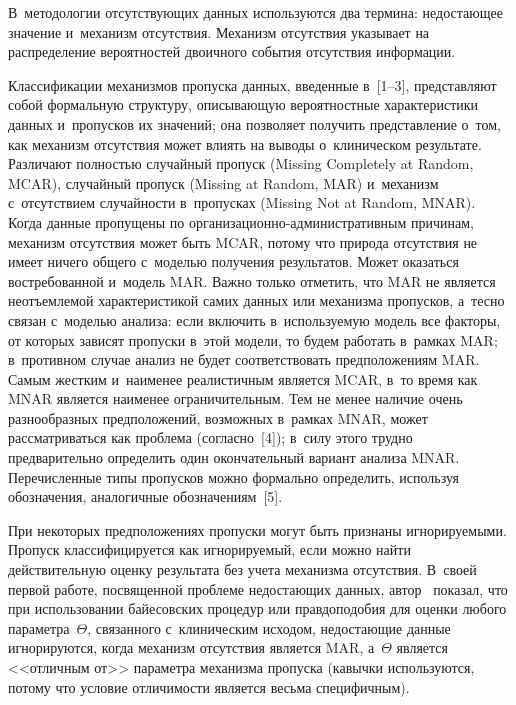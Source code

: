 \begin{multicols}{2}
     В~методологии отсутствующих данных используются два термина: 
недостающее значение и~механизм отсутствия. Механизм отсутствия указывает 
на распределение вероятностей двоичного события отсутствия информации. 
     
     Классификации механизмов пропуска данных, введенные в~[1--3], 
представляют собой формальную структуру, описывающую вероятностные 
характеристики данных и~пропусков их значений; она позволяет получить 
представление о~том, как механизм отсутствия может влиять на выводы 
о~клиническом результате. Различают полностью случайный пропуск (Missing 
Completely at Random, MCAR), случайный пропуск (Missing at Random, MAR) 
и~механизм с~отсутствием слу\-чай\-ности в~пропусках (Missing Not at Random, 
MNAR). Когда данные пропущены по ор\-га\-ни\-за\-ци\-он\-но-ад\-ми\-ни\-стра\-тив\-ным 
причинам, механизм отсутствия может быть MCAR, потому что природа 
отсутствия не имеет ничего общего с~моделью получения результатов. Может 
оказаться востребованной и~модель MAR. Важно только отметить, что MAR не 
является неотъемлемой характеристикой самих данных или механизма 
пропусков, а~тесно связан с~моделью анализа: если включить в~используемую 
модель все факторы, от которых зависят пропуски в~этой модели, то будем 
работать в~рамках MAR; в~противном случае анализ не будет соответствовать 
предположениям MAR.   Самым жестким и~наименее 
реалистичным является MCAR, в~то время как MNAR является наименее ограничительным. Тем 
не менее наличие очень разнообразных предположений, возможных в~рамках 
MNAR, может рассматриваться как проблема (согласно~[4]); в~силу этого 
трудно предварительно определить один окончательный вариант анализа 
MNAR. Пе\-ре\-чис\-лен\-ные типы пропусков можно формально определить, 
используя обозначения, аналогичные обозначениям~[5]. 
{

}
     
     При некоторых предположениях пропуски могут быть признаны 
игнорируемыми. Пропуск классифицируется как игнорируемый, если можно 
\mbox{найти} действительную оценку результата без учета механизма отсутствия. 
В~своей первой работе, посвященной проблеме недостающих данных, 
автор~\cite{1-kri} показал, что при использовании байесовских процедур или 
правдоподобия для оценки любого параметра~$\Theta$, связанного 
с~клиническим исходом, недостающие данные игнорируются, когда механизм 
отсутствия является MAR, а~$\Theta$ является <<отличным от>> параметра 
механизма пропуска (кавычки используются, потому что условие отличимости 
является весьма специфичным).
     

\end{multicols}
